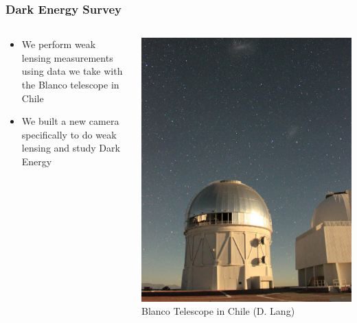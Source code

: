 \documentclass{beamer}
\begin{document}
\frame
{

    \frametitle{Dark Energy Survey}


    \begin{columns}
        \begin{column}{0.5\textwidth}
            \begin{itemize}

                \item We perform weak lensing measurements using data we take
                    with the Blanco telescope in Chile

                \item We built a new camera specifically to do weak lensing and
                    study Dark Energy

            \end{itemize}

        \end{column}
        \begin{column}{0.5\textwidth}
            \begin{center}
                \includegraphics[height=0.7\textheight]{blanco-dustin-lang.jpg}
                \newline
                {\tiny Blanco Telescope in Chile (D. Lang)}
            \end{center}
        \end{column}

    \end{columns}


}
\end{document}
